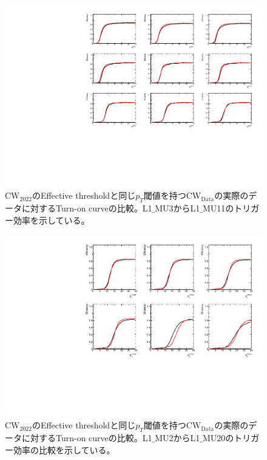 \begin{figure}[htb]
  \centering
  \includegraphics[clip, width=12cm]{fig/5/v05v06_1_9.pdf}
  \caption{$\mathrm{CW_{2022}}$のEffective thresholdと同じ$p_T$閾値を持つ$\mathrm{CW_{Data}}$の実際のデータに対するTurn-on curveの比較。L1$\_$MU3からL1$\_$MU11のトリガー効率を示している。}
  \label{fig:v05v06_1_9_Data}
\end{figure}

\begin{figure}[htb]
  \centering
  \includegraphics[clip, width=12cm]{fig/5/v05v06_10_15.pdf}
  \caption{$\mathrm{CW_{2022}}$のEffective thresholdと同じ$p_T$閾値を持つ$\mathrm{CW_{Data}}$の実際のデータに対するTurn-on curveの比較。L1$\_$MU2からL1$\_$MU20のトリガー効率の比較を示している。}
  \label{fig:v05v06_12_20_Data}
\end{figure}

